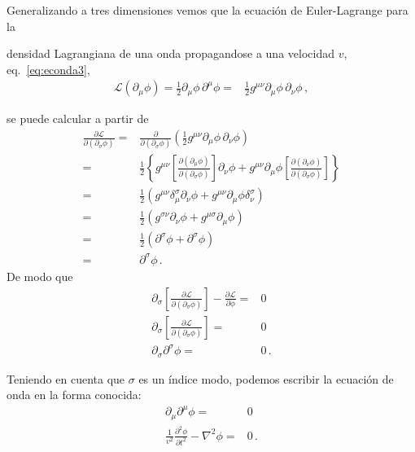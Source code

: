 Generalizando a tres dimensiones vemos que la ecuación de Euler-Lagrange para la
\begin{frame}
densidad Lagrangiana de una onda propagandose a una velocidad $v$, eq.~\eqref{eq:econda3},
\begin{align}
  \mathcal{L}(\partial_{\mu} \phi)=  \frac{1}{2}{\partial_\mu\phi}\,{\partial^\mu\phi}
  =& \frac{1}{2}g^{\mu\nu}{\partial_\mu\phi}\,{\partial_{\nu}\phi}\,,
\end{align}
\end{frame}
se puede calcular a partir de
\begin{align}
  \frac{\partial\mathcal{L}}{\partial(\partial_{\sigma}\phi)}=&
                                                                \frac{\partial}{\partial(\partial_{\sigma}\phi)} \left( \frac{1}{2}g^{\mu\nu}{\partial_\mu\phi}\,{\partial_{\nu}\phi} \right) \nonumber\\
    =&\frac{1}{2} \left\{  g^{\mu\nu}\left[ \frac{\partial \left( \partial_{\mu}\phi \right)}{\partial \left( \partial_{\sigma}\phi \right)} \right]\partial_{\nu}\phi
     +g^{\mu\nu} \partial_{\mu}\phi \left[ \frac{\partial \left( \partial_{\nu}\phi \right)}{\partial \left( \partial_{\sigma}\phi \right)} \right] \right\} \nonumber\\
    =&\frac{1}{2}\left(  g^{\mu\nu}\delta^{\sigma}_{\mu}\partial_{\nu}\phi
     +  g^{\mu\nu}\partial_{\mu}\phi \delta ^{\sigma}_{\nu}\right) \nonumber\\
    =&\frac{1}{2}\left(  g^{\sigma\nu}\partial_{\nu}\phi
       +  g^{\mu\sigma}\partial_{\mu}\phi \right) \nonumber\\
           =&\frac{1}{2}\left(  \partial^{\sigma}\phi
     + \partial^{\sigma}\phi \right) \nonumber\\
=& \partial^{\sigma}\phi\,.
\end{align}
De modo que
\begin{align}
   \partial_{\sigma} \left[ \frac{\partial\mathcal{L}}{\partial(\partial_{\sigma}\phi)}\right]-\frac{\partial\mathcal{L}}{\partial\phi}=&0 \nonumber\\
  \partial_{\sigma} \left[ \frac{\partial\mathcal{L}}{\partial(\partial_{\sigma}\phi)}\right]=&0 \nonumber\\
       \partial_{\sigma}\partial^{\sigma}\phi=&0 \,.
\end{align}
\begin{frame}
Teniendo en cuenta que $\sigma$ es un índice modo, podemos escribir la ecuación de onda en la forma conocida:
\begin{align}
     \partial_{\mu}\partial^{\mu}\phi=&0 \nonumber\\
     \frac{1}{v^2}\frac{\partial^2\phi}{\partial t^2}-\nabla^2\phi=&0\,.
\end{align}
\end{frame}

